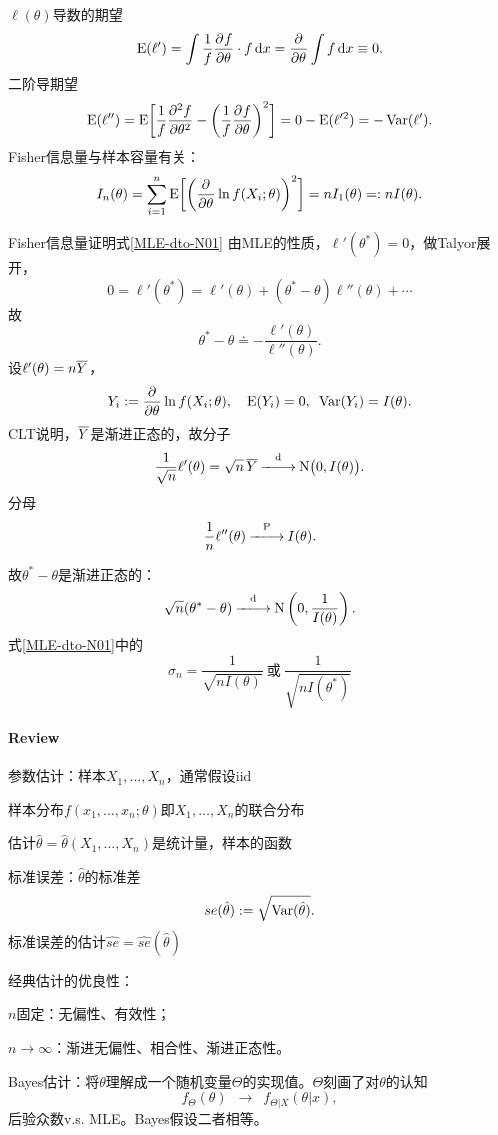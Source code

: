 $\ell(\theta)$导数的期望
\[
	\E(\ell')=\int\frac1f\pv f\theta\cdot f\d x=\pp\theta\int f\d x\equiv 0.
\]
二阶导期望
\[
	\E(\ell'')=\E\biggl[\frac1f\pv[2]f\theta-\biggl(\frac1f\pv f\theta\biggr)^2\biggr]=0-\E(\ell'^2)=-\Var(\ell').
\]
Fisher信息量与样本容量有关：
\[
	I_n(\theta)=\sum_{i=1}^n\E\biggl[\biggl(\pp\theta\ln f(X_i;\theta)\biggr)^2\biggr]=nI_1(\theta)=:nI(\theta).
\]
\begin{example}{Fisher信息量证明式\eqref{MLE-dto-N01}}{}
	由MLE的性质，$\ell'(\theta^\ast)=0$，做Talyor展开，
	\[
		0=\ell'(\theta^\ast)=\ell'(\theta)+(\theta^\ast-\theta)\ell''(\theta)+\cdots
	\]
	故
	\[
		\theta^\ast-\theta\doteq-\frac{\ell'(\theta)}{\ell''(\theta)}.
	\]
	设$\ell'(\theta)=n\avg Y$，
	\[
		Y_i:=\pp\theta\ln f(X_i;\theta),\quad\E(Y_i)=0,\enspace\Var(Y_i)=I(\theta).
	\]
	CLT说明，$\avg Y$是渐进正态的，故分子
	\[
		\frac1{\sqrt n}\ell'(\theta)=\sqrt n\,\avg Y\dto\Norm\bigkh{0,I(\theta)}.
	\]
	分母
	\[
		\frac1n\ell''(\theta)\pto I(\theta).
	\]

	故$\theta^\ast-\theta$是渐进正态的：
	\[
		\sqrt n(\theta^\ast-\theta)\dto\Norm\kh{0,\frac1{I(\theta)}}.
	\]
	式\eqref{MLE-dto-N01}中的 
	\[
		\sigma_n=\frac1{\sqrt{nI(\theta)}}~\text{或}~\frac1{\sqrt{nI(\theta^\ast)}}
	\]
\end{example}
\paragraph{Review}
\begin{compactenum}
	\item 参数估计：样本$X_1,\ldots,X_n$，通常假设iid
	
	样本分布$f(x_1,\ldots,x_n;\theta)$即$X_1,\ldots,X_n$的联合分布

	估计$\hat\theta=\hat\theta(X_1,\ldots,X_n)$是统计量，样本的函数

	标准误差：$\hat\theta$的标准差
	\begin{align}
		se(\hat\theta):=\sqrt{\Var(\hat\theta)}.
	\end{align}
	标准误差的估计$\hat{se}=\hat{se}(\hat\theta)$
	\item 经典估计的优良性：
	
	$n$固定：无偏性、有效性；

	$n\to\infty$：渐进无偏性、相合性、渐进正态性。

	\item Bayes估计：将$\theta$理解成一个随机变量$\varTheta$的实现值。$\varTheta$刻画了对$\theta$的认知
	\[
		f_\varTheta(\theta)\enspace\to\enspace f_{\varTheta|X}(\theta|x),
	\]
	后验众数v.s. MLE。Bayes假设二者相等。
\end{compactenum}

